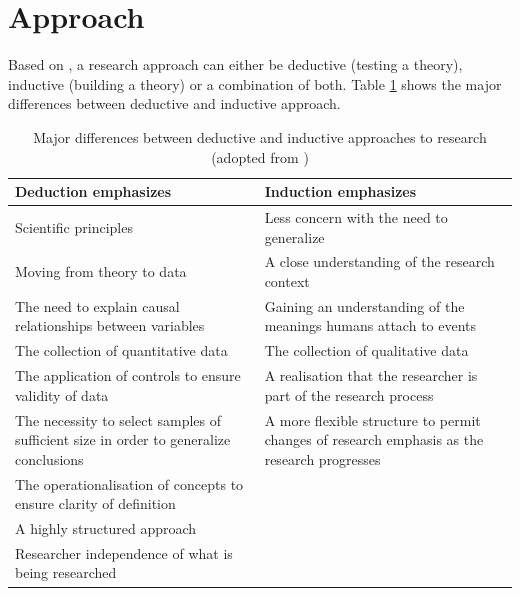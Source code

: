 
\section{Approach}

Based on \cite{Saunders2009}, a research approach can either be deductive (testing a theory), inductive (building a theory) or a combination of both. Table \ref{tbl:inductivedeductive} shows the major differences between deductive and inductive approach.
\begin{table}[h!]
	\begin{center}
		\begin{tabular}{ p{6.5cm} p{7.5cm} }
			\toprule
			\textbf{Deduction emphasizes} & \textbf{Induction emphasizes} \\
			\midrule
			Scientific principles & Less concern with the need to generalize \\
			Moving from theory to data & A close understanding of the research context  \\
			The need to explain causal relationships between variables & Gaining an understanding of the meanings humans attach to events \\
			The collection of quantitative data & The collection of qualitative data \\
			The application of controls to ensure validity of data & A realisation that the researcher is part of the research process \\
			The necessity to select samples of sufficient size in order to generalize conclusions & A more flexible structure to permit changes of research emphasis as the research progresses \\
			The operationalisation of concepts to ensure clarity of definition & \\
			A highly structured approach & \\
			Researcher independence of what is being researched & \\
			\bottomrule
		\end{tabular}
		\caption[Major differences between deductive and inductive approaches to research]{Major differences between deductive and inductive approaches to research (adopted from {\citealp[pg. 127]{Saunders2009}})}
		\label{tbl:inductivedeductive}
	\end{center}
\end{table} \newline
